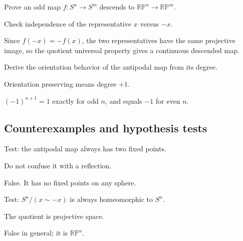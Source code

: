 \begin{exercise}\label{exr:viii04-ped-08}
Prove an odd map $f:S^n\to S^m$ descends to $\mathbb{RP}^n\to\mathbb{RP}^m$.
\end{exercise}
\begin{hint}
Check independence of the representative $x$ versus $-x$.
\end{hint}
\begin{solution}
Since $f(-x)=-f(x)$, the two representatives have the same projective image, so the quotient universal property gives a continuous descended map.
\end{solution}

\begin{exercise}\label{exr:viii04-ped-09}
Derive the orientation behavior of the antipodal map from its degree.
\end{exercise}
\begin{hint}
Orientation preserving means degree $+1$.
\end{hint}
\begin{solution}
$(-1)^{n+1}=1$ exactly for odd $n$, and equals $-1$ for even $n$.
\end{solution}

\subsection*{Counterexamples and hypothesis tests}

\begin{exercise}\label{exr:viii04-ped-10}
Test: the antipodal map always has two fixed points.
\end{exercise}
\begin{hint}
Do not confuse it with a reflection.
\end{hint}
\begin{solution}
False. It has no fixed points on any sphere.
\end{solution}

\begin{exercise}\label{exr:viii04-ped-11}
Test: $S^n/(x\sim -x)$ is always homeomorphic to $S^n$.
\end{exercise}
\begin{hint}
The quotient is projective space.
\end{hint}
\begin{solution}
False in general; it is $\mathbb{RP}^n$.
\end{solution}


